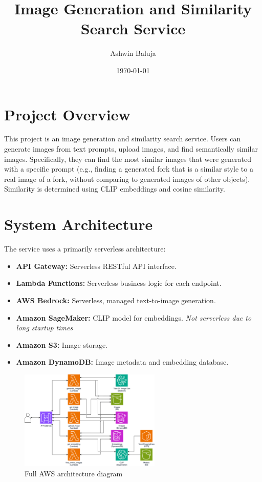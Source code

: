 \documentclass{article}
\title{Image Generation and Similarity Search Service}
\author{Ashwin Baluja}
\date{\today}
\begin{document}
\maketitle

\section{Project Overview}
This project is an image generation and similarity search service.  Users can generate images from text prompts, upload images, and find semantically similar images.  Specifically, they can find the most similar images that were generated with a specific prompt (e.g., finding a generated fork that is a similar style to a real image of a fork, without comparing to generated images of other objects). Similarity is determined using CLIP embeddings and cosine similarity.

\section{System Architecture}

The service uses a primarily serverless architecture:

\begin{itemize}[noitemsep,topsep=0pt,parsep=0pt,partopsep=0pt] %
    \item \textbf{API Gateway:} Serverless RESTful API interface.
    \item \textbf{Lambda Functions:} Serverless business logic for each endpoint.
    \item \textbf{AWS Bedrock:} Serverless, managed text-to-image generation.
    \item \textbf{Amazon SageMaker:} CLIP model for embeddings. \textit{Not serverless due to long startup times}
    \item \textbf{Amazon S3:} Image storage.
    \item \textbf{Amazon DynamoDB:} Image metadata and embedding database.
\end{itemize}


\begin{figure}[h!]
    \centering
    \includegraphics[width=0.6\textwidth]{architecture_diagram.png} %
    \caption{Full AWS architecture diagram}
    \label{fig:arch}
\end{figure}
\end{document}
